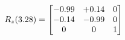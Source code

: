 \documentclass[preview]{standalone}
\begin{document}
\begin{align*}
\special{dvisvgm:raw <g id='unique000'>}R_{z}(3.28) = \begin{bmatrix}-0.99 & +0.14 & 0 \\-0.14 & -0.99 & 0 \\0 & 0 & 1\end{bmatrix}\special{dvisvgm:raw </g>}
\end{align*}
\end{document}
